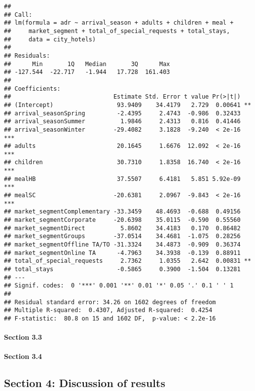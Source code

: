 \documentclass[]{article}
\let\oldparagraph\paragraph
\renewcommand{\paragraph}[1]{\oldparagraph{#1}\mbox{}}
\begin{document}
\begin{verbatim}
## 
## Call:
## lm(formula = adr ~ arrival_season + adults + children + meal + 
##     market_segment + total_of_special_requests + total_stays, 
##     data = city_hotels)
## 
## Residuals:
##      Min       1Q   Median       3Q      Max 
## -127.544  -22.717   -1.944   17.728  161.403 
## 
## Coefficients:
##                             Estimate Std. Error t value Pr(>|t|)    
## (Intercept)                  93.9409    34.4179   2.729  0.00641 ** 
## arrival_seasonSpring         -2.4395     2.4743  -0.986  0.32433    
## arrival_seasonSummer          1.9846     2.4313   0.816  0.41446    
## arrival_seasonWinter        -29.4082     3.1828  -9.240  < 2e-16 ***
## adults                       20.1645     1.6676  12.092  < 2e-16 ***
## children                     30.7310     1.8358  16.740  < 2e-16 ***
## mealHB                       37.5507     6.4181   5.851 5.92e-09 ***
## mealSC                      -20.6381     2.0967  -9.843  < 2e-16 ***
## market_segmentComplementary -33.3459    48.4693  -0.688  0.49156    
## market_segmentCorporate     -20.6398    35.0115  -0.590  0.55560    
## market_segmentDirect          5.8602    34.4183   0.170  0.86482    
## market_segmentGroups        -37.0514    34.4681  -1.075  0.28256    
## market_segmentOffline TA/TO -31.3324    34.4873  -0.909  0.36374    
## market_segmentOnline TA      -4.7963    34.3938  -0.139  0.88911    
## total_of_special_requests     2.7362     1.0355   2.642  0.00831 ** 
## total_stays                  -0.5865     0.3900  -1.504  0.13281    
## ---
## Signif. codes:  0 '***' 0.001 '**' 0.01 '*' 0.05 '.' 0.1 ' ' 1
## 
## Residual standard error: 34.26 on 1602 degrees of freedom
## Multiple R-squared:  0.4307, Adjusted R-squared:  0.4254 
## F-statistic:  80.8 on 15 and 1602 DF,  p-value: < 2.2e-16
\end{verbatim}

\hypertarget{section-3.3}{%
\paragraph{Section 3.3}\label{section-3.3}}

\hypertarget{section-3.4}{%
\paragraph{Section 3.4}\label{section-3.4}}

\hypertarget{section-4-discussion-of-results}{%
\subsection{Section 4: Discussion of
results}\label{section-4-discussion-of-results}}
\end{document}
